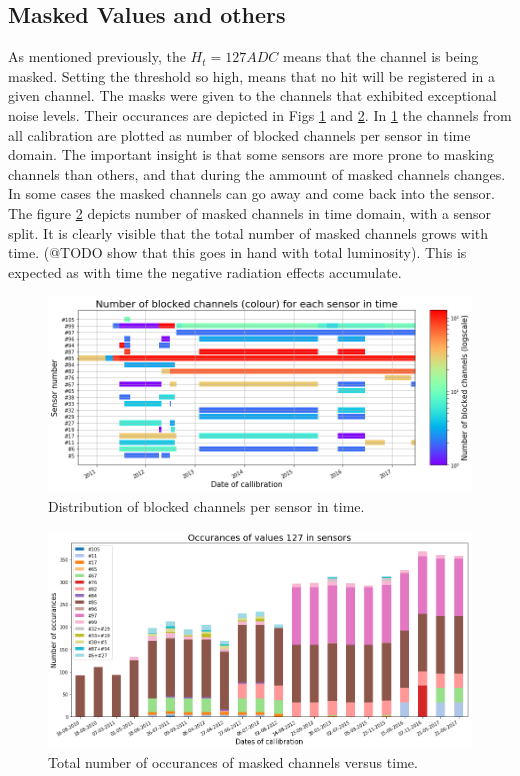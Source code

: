 \subsection{Masked Values and others}



  As mentioned previously, the $H_t=127 ADC$ means that the channel is being masked.
  Setting the threshold so high, means that no hit will be registered in a given channel.
  The masks were given to the channels that exhibited exceptional noise levels.
  Their occurances are depicted in Figs \ref{plot:p3-mask-time} and \ref{plot:p3-mask-time2}.
  In  \ref{plot:p3-mask-time} the channels from all calibration are plotted as number of blocked channels per sensor in time domain.
  The important insight is that some sensors are more prone to masking channels than others, and that during the ammount of masked channels changes.
  In some cases the masked channels can go away and come back into the sensor.
  The figure \ref{plot:p3-mask-time2} depicts number of masked channels in time domain, with a sensor split.
  It is clearly visible that the total number of masked channels grows with time.
  (@TODO show that this goes in hand with total luminosity).
  This is expected as with time the negative radiation effects accumulate.

\begin{figure}
    \centering
    \includegraphics[width=0.7\linewidth]{figures/chapter4/calib_analysis/P3-mask-time.png}
    \caption{Distribution of blocked channels per sensor in time.}
    \label{plot:p3-mask-time}
\end{figure}

\begin{figure}
    \centering
    \includegraphics[width=0.7\linewidth]{figures/chapter4/calib_analysis/P3-mask-time2.png}
    \caption{Total number of occurances of masked channels versus time.}
    \label{plot:p3-mask-time2}
\end{figure}

